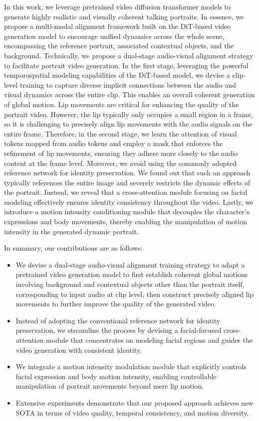 \documentclass[sigconf]{acmart}
\begin{document}
In this work, we leverage pretrained video diffusion transformer models to generate highly realistic and visually coherent talking portraits. In essence, we propose a multi-modal alignment framework built on the DiT-based video generation model to encourage unified dynamics across the whole scene, encompassing the reference portrait, associated contextual objects, and the background. Technically, we propose a dual-stage audio-visual alignment strategy to facilitate portrait video generation. In the first stage, leveraging the powerful temporospatial modeling capabilities of the DiT-based model, we devise a clip-level training to capture diverse implicit connections between the audio and visual dynamics across the entire clip. This enables an overall coherent generation of global motion.  Lip movements are critical for enhancing the quality of the portrait video. However, the lip typically only occupies a small region in a frame, so it is challenging to precisely align lip movements with the audio signals on the entire frame. Therefore, in the second stage, we learn the attention of visual tokens mapped from audio tokens and employ a mask that enforces the refinement of lip movements, ensuring they adhere more closely to the audio content at the frame level. Moreover, we avoid using the commonly adopted reference network for identity preservation. We found out that such an approach typically references the entire image and severely restricts the dynamic effects of the portrait. Instead, we reveal that a cross-attention module focusing on facial modeling effectively ensures identity consistency throughout the video. Lastly, we introduce a motion intensity conditioning module that decouples the character's expressions and body movements, thereby enabling the manipulation of motion intensity in the generated dynamic portrait. 

In summary, our contributions are as follows:
\begin{itemize}
    \item We devise a dual-stage audio-visual alignment training strategy to adapt a pretrained video generation model to first establish coherent global motions involving background and contextual objects other than the portrait itself, corresponding to input audio at clip level, then construct precisely aligned lip movements to further improve the quality of the generated video. 
    \item Instead of adopting the conventional reference network for identity preservation, we streamline the process by devising a facial-focused cross-attention module that concentrates on modeling facial regions and guides the video generation with consistent identity.
    \item We integrate a motion intensity modulation module that explicitly controls facial expression and body motion intensity, enabling controllable manipulation of portrait movements beyond mere lip motion.
    \item Extensive experiments demonstrate that our proposed approach achieves new SOTA in terms of video quality, temporal consistency, and motion diversity.
\end{itemize}
\end{document}
